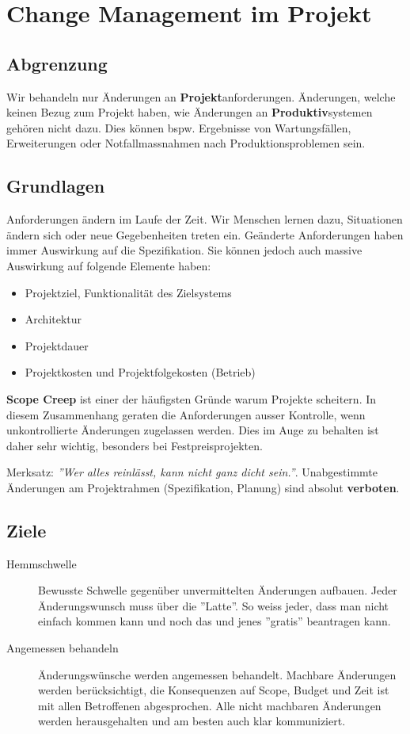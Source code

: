 \chapter{Change Management im Projekt}
\label{sec:change_mgmt}

\section{Abgrenzung}
Wir behandeln nur Änderungen an \textbf{Projekt}anforderungen. Änderungen, welche keinen Bezug zum Projekt haben, wie Änderungen an \textbf{Produktiv}systemen gehören nicht dazu. Dies können bspw. Ergebnisse von Wartungsfällen, Erweiterungen oder Notfallmassnahmen nach Produktionsproblemen sein.

\section{Grundlagen}
Anforderungen ändern im Laufe der Zeit. Wir Menschen lernen dazu, Situationen ändern sich oder neue Gegebenheiten treten ein. Geänderte Anforderungen haben immer Auswirkung auf die Spezifikation. Sie können jedoch auch massive Auswirkung auf folgende Elemente haben:
\begin{itemize}
	\item Projektziel, Funktionalität des Zielsystems
	\item Architektur
	\item Projektdauer
	\item Projektkosten und Projektfolgekosten (Betrieb)
\end{itemize}

\textbf{Scope Creep} ist einer der häufigsten Gründe warum Projekte scheitern. In diesem Zusammenhang geraten die Anforderungen ausser Kontrolle, wenn unkontrollierte Änderungen zugelassen werden. Dies im Auge zu behalten ist daher sehr wichtig, besonders bei Festpreisprojekten.

Merksatz: \textit{''Wer alles reinlässt, kann nicht ganz dicht sein.''}. Unabgestimmte Änderungen am Projektrahmen (Spezifikation, Planung) sind absolut \textbf{verboten}.

\section{Ziele}
\begin{description}
	\item[Hemmschwelle] Bewusste Schwelle gegenüber unvermittelten Änderungen aufbauen. Jeder Änderungswunsch muss über die ''Latte''. So weiss jeder, dass man nicht einfach kommen kann und noch das und jenes ''gratis'' beantragen kann.
	\item[Angemessen behandeln] Änderungswünsche werden angemessen behandelt. Machbare Änderungen werden berücksichtigt, die Konsequenzen auf Scope, Budget und Zeit ist mit allen Betroffenen abgesprochen. Alle nicht machbaren Änderungen werden herausgehalten und am besten auch klar kommuniziert.
\end{description}

